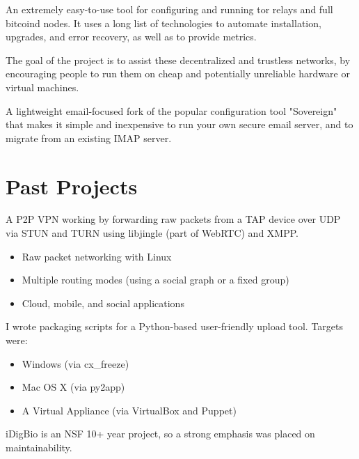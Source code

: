 \documentclass[11pt, letterpaper]{article}
\begin{document}

An extremely easy-to-use tool for configuring and running tor relays and full
bitcoind nodes. It uses a long list of technologies to automate installation,
upgrades, and error recovery, as well as to provide metrics.

The goal of the project is to assist these decentralized and trustless networks,
by encouraging people to run them on cheap and potentially unreliable hardware
or virtual machines.


A lightweight email-focused fork of the popular configuration tool "Sovereign"
that makes it simple and inexpensive to run your own secure email server, and to
migrate from an existing IMAP server.

\vfill

\section{Past Projects}

A P2P VPN working by forwarding raw packets from a TAP device over UDP via
STUN and TURN using libjingle (part of WebRTC) and XMPP.

\begin{itemize}
    \item Raw packet networking with Linux
    \item Multiple routing modes (using a social graph or a fixed group)
    \item Cloud, mobile, and social applications
\end{itemize}%


I wrote packaging scripts for a Python-based user-friendly upload tool. Targets
were:

\begin{itemize}
    \item Windows (via cx\_freeze)
    \item Mac OS X (via py2app)
    \item A Virtual Appliance (via VirtualBox and Puppet)
\end{itemize}

iDigBio is an NSF 10+ year project, so a strong emphasis was placed on
maintainability.

\pagebreak

\end{document}
